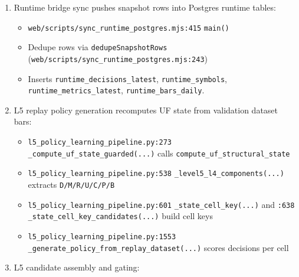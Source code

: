 \documentclass[
]{article}
\providecommand{\tightlist}{%
  \setlength{\itemsep}{0pt}\setlength{\parskip}{0pt}}
\begin{document}
\begin{enumerate}
  \begin{itemize}
  \tightlist
  \item
    \texttt{rebuild\_uf\_snapshot.py:620}
    \texttt{rebuild\_snapshot(...)}
  \item
    Appends rows at \texttt{rebuild\_uf\_snapshot.py:754}
  \item
    Writes SES envelope via \texttt{\_save\_snapshot\_envelope} at
    \texttt{rebuild\_uf\_snapshot.py:787}
  \end{itemize}
\item
  Runtime bridge sync pushes snapshot rows into Postgres runtime tables:

  \begin{itemize}
  \tightlist
  \item
    \texttt{web/scripts/sync\_runtime\_postgres.mjs:415} \texttt{main()}
  \item
    Dedupe rows via \texttt{dedupeSnapshotRows}
    (\texttt{web/scripts/sync\_runtime\_postgres.mjs:243})
  \item
    Inserts \texttt{runtime\_decisions\_latest},
    \texttt{runtime\_symbols}, \texttt{runtime\_metrics\_latest},
    \texttt{runtime\_bars\_daily}.
  \end{itemize}
\item
  L5 replay policy generation recomputes UF state from validation
  dataset bars:

  \begin{itemize}
  \tightlist
  \item
    \texttt{l5\_policy\_learning\_pipeline.py:273}
    \texttt{\_compute\_uf\_state\_guarded(...)} calls
    \texttt{compute\_uf\_structural\_state}
  \item
    \texttt{l5\_policy\_learning\_pipeline.py:538}
    \texttt{\_level5\_l4\_components(...)} extracts
    \texttt{D/M/R/U/C/P/B}
  \item
    \texttt{l5\_policy\_learning\_pipeline.py:601}
    \texttt{\_state\_cell\_key(...)} and \texttt{:638}
    \texttt{\_state\_cell\_key\_candidates(...)} build cell keys
  \item
    \texttt{l5\_policy\_learning\_pipeline.py:1553}
    \texttt{\_generate\_policy\_from\_replay\_dataset(...)} scores
    decisions per cell
  \end{itemize}
\item
  L5 candidate assembly and gating:


\end{enumerate}
\end{document}
